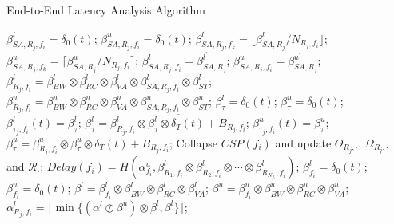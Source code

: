 \documentclass[10pt,journal]{IEEEtran}
\begin{document}
\begin{algorithm}
\caption{End-to-End Latency Analysis Algorithm}
\label{alg:equivalentservicecurve}
\begin{algorithmic}[1]
            \STATE $\beta_{SA,R_j,f_i}^l=\delta_0(t)$; $\beta_{SA,R_j,f_i}^u=\delta_0(t)$;
        \ENDFOR
    \ENDFOR
                    \STATE $\beta_{SA,R_j,f_k}^{l^\prime}=\lfloor\beta_{SA,R_j}^l/N_{R_j,f_i}\rfloor$;
                    \STATE $\beta_{SA,R_j,f_k}^{u^\prime}=\lceil\beta_{SA,R_j}^u/N_{R_j,f_i}\rceil$;
                \ENDFOR
            \ENDIF
                \STATE $\beta_{SA,R_j,f_i}^l=\beta_{SA,R_j}^{l^\prime}$; $\beta_{SA,R_j,f_i}^u=\beta_{SA,R_j}^{u^\prime}$;
            \ENDIF
            \STATE $\beta_{R_j,f_i}^l=\beta_{BW}^l\otimes\beta_{RC}^l\otimes\beta_{VA}^l\otimes\beta_{SA,R_j,f_i}^l\otimes \beta_{ST}^l$;
            \STATE $\beta_{R_j,f_i}^u=\beta_{BW}^u\otimes\beta_{RC}^u\otimes\beta_{VA}^u\otimes\beta_{SA,R_j,f_i}^u\otimes \beta_{ST}^u$;
        \ENDFOR
        \STATE $\beta_{\tau}^l=\delta_0(t)$; $\beta_{\tau}^u=\delta_0(t)$;
            \STATE $\beta^{l}_{\tau_j,f_i}(t)=\beta_{\tau}^l$; $\beta_{\tau}^l=\overline{\beta^l_{R_j,f_i}\otimes\beta^{l}_{\tau}\otimes\delta_T(t)+B_{R_j,f_i}}$;
            \STATE $\beta^{u}_{\tau_j,f_i}(t)=\beta_{\tau}^u$; $\beta_{\tau}^u=\overline{\beta^u_{R_j,f_i}\otimes\beta^{u}_{\tau}\otimes\delta_T(t)+B_{R_j,f_i}}$;
        \ENDFOR
        \STATE Collapse $CSP(f_i)$ and update $\Theta_{R_j,\cdot}$, $\Omega_{R_j,\cdot}$ and $\mathcal{R}_{\cdot}$;
        \STATE $Delay(f_i)=H(\alpha^u_{f_i},\beta^l_{R_1,f_i}\otimes\beta^l_{R_2,f_i}\otimes\cdots\otimes\beta^l_{R_{N_{f_i}},f_i})$;
        \STATE $\beta_{f_i}^l=\delta_0(t)$; $\beta_{f_i}^u=\delta_0(t)$;
            \STATE $\beta^l=\beta^l_{f_i}\otimes\beta_{BW}^l\otimes\beta_{RC}^l\otimes\beta_{VA}^l$;
            \STATE $\beta^u=\beta^u_{f_i}\otimes\beta_{BW}^u\otimes\beta_{RC}^u\otimes\beta_{VA}^u$;
            \STATE $\alpha^l_{R_j,f_i}=\lfloor\min\{(\alpha^l\oslash\beta^u)\otimes\beta^l,\beta^l\}\rfloor$;

\end{algorithmic}
\end{algorithm}
\end{document}
